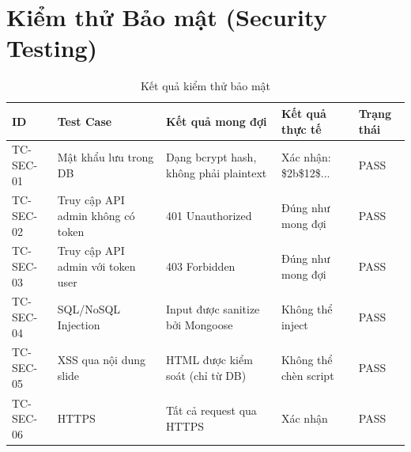 \section{Kiểm thử Bảo mật (Security Testing)}

\begin{table}[H]
\centering
\caption{Kết quả kiểm thử bảo mật}
\begin{tabular}{|p{}|p{}|p{}|p{}|p{}|}
\hline
\textbf{ID} & \textbf{Test Case} & \textbf{Kết quả mong đợi} & \textbf{Kết quả thực tế} & \textbf{Trạng thái} \\
\hline
TC-SEC-01 & Mật khẩu lưu trong DB & Dạng bcrypt hash, không phải plaintext & Xác nhận: \$2b\$12\$... & PASS \\
\hline
TC-SEC-02 & Truy cập API admin không có token & 401 Unauthorized & Đúng như mong đợi & PASS \\
\hline
TC-SEC-03 & Truy cập API admin với token user & 403 Forbidden & Đúng như mong đợi & PASS \\
\hline
TC-SEC-04 & SQL/NoSQL Injection & Input được sanitize bởi Mongoose & Không thể inject & PASS \\
\hline
TC-SEC-05 & XSS qua nội dung slide & HTML được kiểm soát (chỉ từ DB) & Không thể chèn script & PASS \\
\hline
TC-SEC-06 & HTTPS & Tất cả request qua HTTPS & Xác nhận & PASS \\
\hline
\end{tabular}
\end{table}





